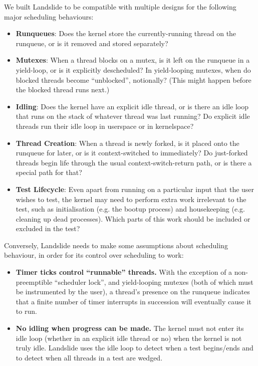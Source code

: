 We built Landslide to be compatible with multiple designs for the following major scheduling behaviours:

\begin{itemize}
	\item {\bf Runqueues}: Does the kernel store the currently-running thread on the runqueue, or is it removed and stored separately?
	\item {\bf Mutexes}: When a thread blocks on a mutex, is it left on the runqueue in a yield-loop, or is it explicitly descheduled? In yield-looping mutexes, when do blocked threads become ``unblocked'', notionally? (This might happen before the blocked thread runs next.)
	\item {\bf Idling}: Does the kernel have an explicit idle thread, or is there an idle loop that runs on the stack of whatever thread was last running? Do explicit idle threads run their idle loop in userspace or in kernelspace?
	\item {\bf Thread Creation}: When a thread is newly forked, is it placed onto the runqueue for later, or is it context-switched to immediately? Do just-forked threads begin life through the usual context-switch-return path, or is there a special path for that?
	\item {\bf Test Lifecycle}: Even apart from running on a particular input that the user wishes to test, the kernel may need to perform extra work irrelevant to the test, such as initialisation (e.g. the bootup process) and housekeeping (e.g. cleaning up dead processes). Which parts of this work should be included or excluded in the test?
\end{itemize}

Conversely, Landslide needs to make some assumptions about scheduling behaviour, in order for its control over scheduling to work:

\begin{itemize}
	\item {\bf Timer ticks control ``runnable'' threads.} With the exception of a non-preemptible ``scheduler lock'', and yield-looping mutexes (both of which must be instrumented by the user), a thread's presence on the runqueue indicates that a finite number of timer interrupts in succession will eventually cause it to run.
	\item {\bf No idling when progress can be made.} The kernel must not enter its idle loop (whether in an explicit idle thread or no) when the kernel is not truly idle. Landslide uses the idle loop to detect when a test begins/ends and to detect when all threads in a test are wedged.
\end{itemize}
